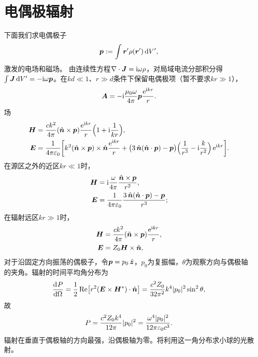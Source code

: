 \section{电偶极辐射}
下面我们求电偶极子
\[
    \bm p := \int\bm r'\rho(\bm r')\mathop{}\!\mathrm{d} V',
\]
激发的电场和磁场。
由连续性方程$\nabla\cdot\bm J = \mathrm{i}\omega\rho$，对局域电流分部积分得$\textstyle \int\bm J\mathop{}\!\mathrm{d} V' = -\mathrm{i}\omega\bm p$。在$kd \ll 1$、$r \gg d$条件下保留电偶极项（暂不要求$kr \gg 1$），
\[
    \bm A = -\mathrm{i}\frac{\mu_0\omega}{4\pi}\bm p\frac{\mathop{}\!\mathrm{e}^{\mathrm{i} kr}}r.
\]
场
\begin{subequations}
    \label{eq:ed-electric-dipole-harmonic-fields}
    \begin{align}
        \bm H &= \frac{ck^2}{4\pi}(\uvec n \times \bm p)\frac{\e^{\i kr}}r\Bigp{1 + \i\frac1{kr}},\\
        \bm E &= \frac1{4\pi\varepsilon_0}\biggb{k^2(\uvec n \times \bm p) \times \uvec n\frac{\e^{\i kr}}r + \bigp{3\uvec n(\uvec n \cdot \bm p) - \bm p}\Bigp{\frac1{r^3} - \i\frac{k}{r^2}}\e^{\i kr}}.
    \end{align}
\end{subequations}
在源区之外的近区$kr \ll 1$时，
\begin{align*}
    \bm H &= \mathrm{i}\frac{\omega}{4\pi}\frac{\mathop{}\!\hat{\bm{n}} \times \bm p}{r^2},\\
    \bm E &= \frac1{4\pi\varepsilon_0}\frac{3\mathop{}\!\hat{\bm{n}}(\mathop{}\!\hat{\bm{n}} \cdot \bm p) - \bm p}{r^3};
\end{align*}
在辐射远区$kr \gg 1$时，
\begin{subequations}
    \label{eq:ed-electric-dipole-far-fields}
    \begin{align}
        \bm H &= \frac{ck^2}{4\pi}(\mathop{}\!\hat{\bm{n}} \times \bm p)\frac{\mathop{}\!\mathrm{e}^{\mathrm{i} kr}}r,\\
        \bm E &= Z_0\bm H \times \mathop{}\!\hat{\bm{n}},
    \end{align}
\end{subequations}
对于沿固定方向振荡的偶极子，令$\bm p = p_0\mathop{}\!\hat{\bm{z}}$，$p_0$为复振幅，$\theta$为观察方向与偶极轴的夹角。辐射的时间平均角分布为
\begin{equation}
    \label{eq:ed-dipole-angular-power}
    \frac{\mathop{}\!\mathrm{d}^{}P}{\mathrm{d}{\Omega}^{}} = \frac12\operatorname{Re}\bigl[r^2(\bm E \times \bm H^\ast) \cdot \mathop{}\!\hat{\bm{n}}\bigr] = \frac{c^2Z_0}{32\pi^2}k^4\lvert p_0\rvert^2\sin^2\theta,
\end{equation}
故
\begin{equation}
    P = \frac{c^2Z_0k^4}{12\pi}\lvert p_0\rvert^2 = \frac{\omega^4\lvert p_0\rvert^2}{12\pi\varepsilon_0c^3}.
\end{equation}
辐射在垂直于偶极轴的方向最强，沿偶极轴为零。将利用这一角分布求小球的光散射。
